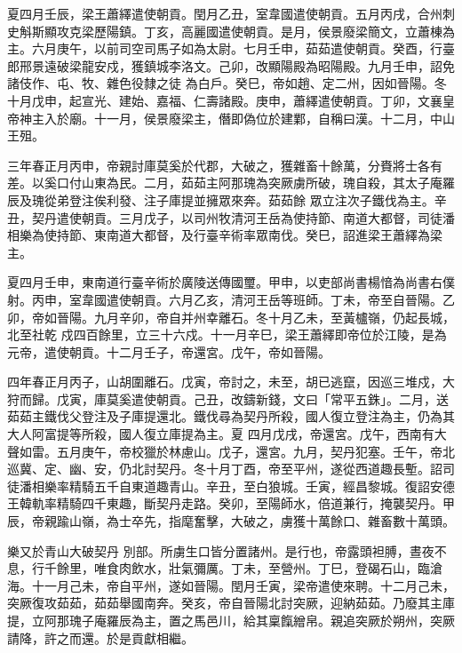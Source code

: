 \begin{pinyinscope}
 夏四月壬辰，梁王蕭繹遣使朝貢。閏月乙丑，室韋國遣使朝貢。五月丙戌，合州刺史斛斯顯攻克梁歷陽鎮。丁亥，高麗國遣使朝貢。是月，侯景廢梁簡文，立蕭棟為主。六月庚午，以前司空司馬子如為太尉。七月壬申，茹茹遣使朝貢。癸酉，行臺郎邢景遠破梁龍安戍，獲鎮城李洛文。己卯，改顯陽殿為昭陽殿。九月壬申，詔免諸伎作、屯、牧、雜色役隸之徒
 為白戶。癸巳，帝如趙、定二州，因如晉陽。冬十月戊申，起宣光、建始、嘉福、仁壽諸殿。庚申，蕭繹遣使朝貢。丁卯，文襄皇帝神主入於廟。十一月，侯景廢梁主，僭即偽位於建鄴，自稱曰漢。十二月，中山王殂。



 三年春正月丙申，帝親討庫莫奚於代郡，大破之，獲雜畜十餘萬，分賚將士各有差。以奚口付山東為民。二月，茹茹主阿那瑰為突厥虜所破，瑰自殺，其太子庵羅辰及瑰從弟登注俟利發、注子庫提並擁眾來奔。茹茹餘
 眾立注次子鐵伐為主。辛丑，契丹遣使朝貢。三月戊子，以司州牧清河王岳為使持節、南道大都督，司徒潘相樂為使持節、東南道大都督，及行臺辛術率眾南伐。癸巳，詔進梁王蕭繹為梁主。



 夏四月壬申，東南道行臺辛術於廣陵送傳國璽。甲申，以吏部尚書楊愔為尚書右僕射。丙申，室韋國遣使朝貢。六月乙亥，清河王岳等班師。丁未，帝至自晉陽。乙卯，帝如晉陽。九月辛卯，帝自并州幸離石。冬十月乙未，至黃櫨嶺，仍起長城，北至社乾
 戍四百餘里，立三十六戍。十一月辛巳，梁王蕭繹即帝位於江陵，是為元帝，遣使朝貢。十二月壬子，帝還宮。戊午，帝如晉陽。



 四年春正月丙子，山胡圍離石。戊寅，帝討之，未至，胡已逃竄，因巡三堆戍，大狩而歸。戊寅，庫莫奚遣使朝貢。己丑，改鑄新錢，文曰「常平五銖」。二月，送茹茹主鐵伐父登注及子庫提還北。鐵伐尋為契丹所殺，國人復立登注為主，仍為其大人阿富提等所殺，國人復立庫提為主。夏
 四月戊戌，帝還宮。戊午，西南有大聲如雷。五月庚午，帝校獵於林慮山。戊子，還宮。九月，契丹犯塞。壬午，帝北巡冀、定、幽、安，仍北討契丹。冬十月丁酉，帝至平州，遂從西道趣長塹。詔司徒潘相樂率精騎五千自東道趣青山。辛丑，至白狼城。壬寅，經昌黎城。復詔安德王韓軌率精騎四千東趣，斷契丹走路。癸卯，至陽師水，倍道兼行，掩襲契丹。甲辰，帝親踰山嶺，為士卒先，指麾奮擊，大破之，虜獲十萬餘口、雜畜數十萬頭。



 樂又於青山大破契丹
 別部。所虜生口皆分置諸州。是行也，帝露頭袒膊，晝夜不息，行千餘里，唯食肉飲水，壯氣彌厲。丁未，至營州。丁巳，登碣石山，臨滄海。十一月己未，帝自平州，遂如晉陽。閏月壬寅，梁帝遣使來聘。十二月己未，突厥復攻茹茹，茹茹舉國南奔。癸亥，帝自晉陽北討突厥，迎納茹茹。乃廢其主庫提，立阿那瑰子庵羅辰為主，置之馬邑川，給其稟餼繒帛。親追突厥於朔州，突厥請降，許之而還。於是貢獻相繼。




\end{pinyinscope}
